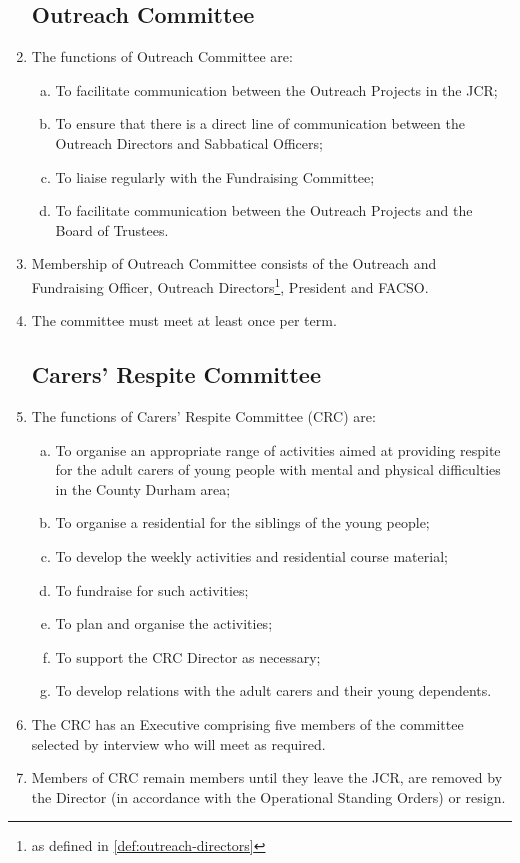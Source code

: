 \documentclass[12pt]{article}
\begin{document}
\begin{enumerate}
    \subsection{Outreach Committee}
    \item The functions of Outreach Committee are:
    \begin{enumerate}[(a)]
        \item To facilitate communication between the Outreach Projects in the JCR;
        \item To ensure that there is a direct line of communication between the Outreach Directors and Sabbatical Officers;
        \item To liaise regularly with the Fundraising Committee;
        \item To facilitate communication between the Outreach Projects and the Board of Trustees.
    \end{enumerate}
    \item Membership of Outreach Committee consists of the Outreach and Fundraising Officer, Outreach Directors\footnote{as defined in \ref{def:outreach-directors}}, President and FACSO.
    \item The committee must meet at least once per term.
    \subsection{Carers' Respite Committee}
    \item The functions of Carers' Respite Committee (CRC) are:
    \begin{enumerate}[(a)]
        \item To organise an appropriate range of activities aimed at providing respite for the adult carers of young people with mental and physical difficulties in the County Durham area;
        \item To organise a residential for the siblings of the young people;
        \item To develop the weekly activities and residential course material;
        \item To fundraise for such activities;
        \item To plan and organise the activities;
        \item To support the CRC Director as necessary;
        \item To develop relations with the adult carers and their young dependents.
    \end{enumerate}
    \item The CRC has an Executive comprising five members of the committee selected by interview who will meet as required.
    \item Members of CRC remain members until they leave the JCR, are removed by the Director (in accordance with the Operational Standing Orders) or resign.

\end{enumerate}
\end{document}
